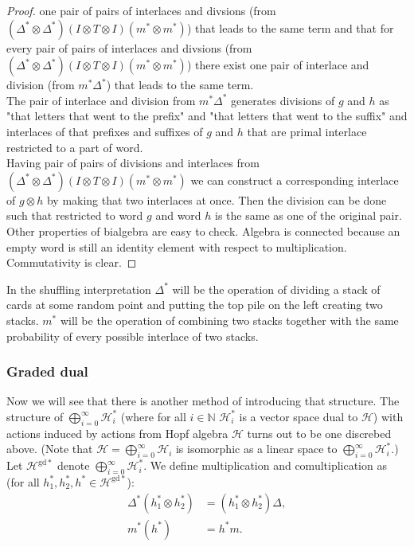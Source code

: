 \documentclass[a4paper, 12pt]{article}
\newcommand{\gdd}[1]{#1^{\mathrm{gd}*}}
\begin{document}
\begin{proof}
one pair of pairs of interlaces and divsions (from $(\Delta^*\otimes \Delta^*)(I \otimes T \otimes I)(m^*
\otimes m^*)$) that leads to the same term and that for every pair of pairs of interlaces and divsions (from
$(\Delta^*\otimes \Delta^*)(I \otimes T \otimes I)(m^*\otimes m^*)$) there exist one pair of interlace and
 division (from
$m^*\Delta^*$) that leads to the same term. \\
The pair of interlace and division from $m^*\Delta^*$ generates divisions of $g$ and $h$ as "that letters
that went to the prefix" and "that letters that went to the suffix" and interlaces of that prefixes and
 suffixes of $g$ and $h$ that are primal interlace restricted to a part of word. \\
Having pair of pairs of divisions and interlaces from $(\Delta^*\otimes \Delta^*)(I \otimes T \otimes I)
(m^*\otimes m^*)$ we can construct a corresponding interlace of $g \otimes h$ by making that two interlaces
at once. Then the division can be done such that restricted to word $g$ and word $h$ is the same as one of
the original pair. \\
Other properties of bialgebra are easy to check.
Algebra is connected because an empty word
is still an identity element with respect to multiplication. Commutativity is clear.
\end{proof}
In the shuffling interpretation $\Delta^*$ will be the operation of dividing a stack of cards at some random
point and putting the top pile on the left creating two stacks. $m^*$ will be the operation of combining two
stacks together with the same probability of every possible interlace of two stacks.
\subsubsection{Graded dual}
Now we will see that there is another method of introducing that structure.
The structure of $\displaystyle\bigoplus^{\infty}_{i = 0} \mathcal{H}_i^*$ (where for all $i \in \mathbb{N}$
$\mathcal{H}_i^*$ is a vector space dual to $\mathcal{H}$) with actions induced by actions
from Hopf algebra $\mathcal{H}$ turns out to be one discrebed above. (Note that $\mathcal{H} =
\displaystyle\bigoplus^{\infty}_{i = 0} \mathcal{H}_i$ is isomorphic as a linear space
to $\displaystyle\bigoplus^{\infty}_{i = 0} \mathcal{H}_i^*$.) \\
\indent Let $\gdd{\mathcal{H}}$ denote $\displaystyle\bigoplus^{\infty}_{i = 0} \mathcal{H}_i^*$.
We define multiplication
\text{$\Delta^* : \mathcal{H}^{\mathrm{gd}*} \otimes \gdd{\mathcal{H}} \to \gdd{\mathcal{H}}$} and
comultiplication
\text{$m^* : \gdd{\mathcal{H}} \to \gdd{\mathcal{H}} \otimes \gdd{\mathcal{H}}$} as
(for all $h_1^*, h_2^*, h^* \in \gdd{\mathcal{H}}$):
\begin{align*}
\Delta^*(h_1^* \otimes h_2^*) &= (h_1^* \otimes h_2^*)\Delta, \\
m^*(h^*) &= h^*m.
\end{align*}
\end{document}
